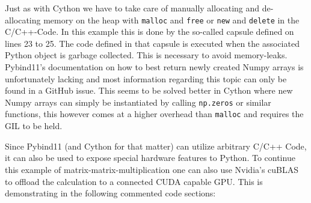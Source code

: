 \documentclass[english,11pt,a4paper,table]{article} %
\begin{document}
Just as with Cython we have to take care of manually allocating and de-allocating memory on the heap with \texttt{malloc} and \texttt{free} or \texttt{new} and \texttt{delete} in the C/C++-Code.
In this example this is done by the so-called capsule defined on lines 23 to 25.
The code defined in that capsule is executed when the associated Python object is garbage collected.
This is necessary to avoid memory-leaks.
Pybind11's documentation on how to best return newly created Numpy arrays is unfortunately lacking and most information regarding this topic can only be found in a GitHub issue. \cite{NotclearPybind}
This seems to be solved better in Cython where new Numpy arrays can simply be instantiated by calling \texttt{np.zeros} or similar functions, this however comes at a higher overhead than \texttt{malloc} and requires the GIL to be held.


Since Pybind11 (and Cython for that matter) can utilize arbitrary C/C++ Code, it can also be used to expose special hardware features to Python.
To continue this example of matrix-matrix-multiplication one can also use Nvidia's cuBLAS to offload the calculation to a connected CUDA capable GPU.
This is demonstrating in the following commented code sections:
\end{document}

